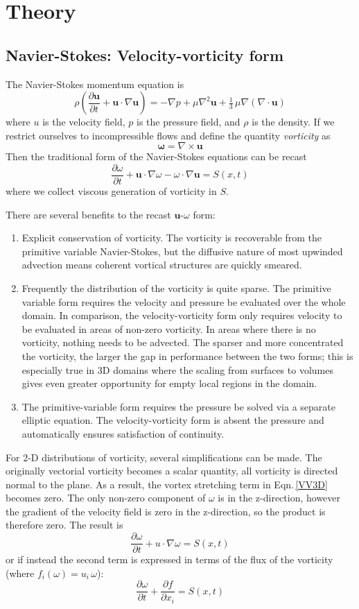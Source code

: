\documentclass[letterpaper,12pt]{report}
\newcommand{\be}{\begin{equation}}
\newcommand{\ben}[1]{\begin{equation}\label{#1}}
\newcommand{\ee}{\end{equation}}
\begin{document}
\chapter{Theory}
\section{Navier-Stokes: Velocity-vorticity form}
The Navier-Stokes momentum equation is
 \be \rho \left(\frac{\partial \mathbf{u}}{\partial t} + \mathbf{u} \cdot \nabla \mathbf{u} \right) = -\nabla p + \mu \nabla^2 \mathbf u + \tfrac13 \, \mu \nabla (\nabla\cdot\mathbf{u}) \ee
where $u$ is the velocity field, $p$ is the pressure field, and $\rho$ is the density. If we restrict ourselves to incompressible flows and define the quantity \textit{vorticity} as
\be \mathbf{\omega} = \nabla \times \mathbf{u} \ee
Then the traditional form of the Navier-Stokes equations can be recast
\ben{VV3D} \frac{\partial \omega}{\partial t} +  \mathbf{u} \cdot \nabla \omega - \omega \cdot \nabla  \mathbf{u} = S(x,t)\ee
where we collect viscous generation of vorticity in $S$.

There are several benefits to the recast $\mathbf{u}$-$\omega$ form:
\begin{enumerate}
\item Explicit conservation of vorticity. The vorticity is recoverable from the primitive variable Navier-Stokes, but the diffusive nature of most upwinded advection means coherent vortical structures are quickly smeared.
\item Frequently the distribution of the vorticity is quite sparse. The primitive variable form requires the velocity and pressure be evaluated over the whole domain. In comparison, the velocity-vorticity form only requires velocity to be evaluated in areas of non-zero vorticity. In areas where there is no vorticity, nothing needs to be advected. The sparser and more concentrated the vorticity, the larger the gap in performance between the two forms; this is especially true in 3D domains where the scaling from surfaces to volumes gives even greater opportunity for empty local regions in the domain. 
\item The primitive-variable form requires the pressure be  solved via a separate elliptic equation. The velocity-vorticity form is absent the pressure and automatically ensures satisfaction of continuity.
\end{enumerate}

For 2-D distributions of vorticity, several simplifications can be made. The originally vectorial vorticity becomes a scalar quantity, all vorticity is directed normal to the plane. As a result, the vortex stretching term in  Eqn.\,\eqref{VV3D} becomes zero. The only non-zero component of $\omega$ is in the z-direction, however the gradient of the velocity field is zero in the z-direction, so the product is therefore zero. The result is
\ben{VV2D} \frac{\partial \omega}{\partial t} + u \cdot \nabla \omega = S(x,t)\ee
or if instead the second term is expressed in terms of the flux of the vorticity (where $f_i(\omega)=u_i\,\omega$):
\ben{VV2DB} \frac{\partial \omega}{\partial t} + \frac{\partial f}{\partial x_i}= S(x,t)\ee
\end{document}

